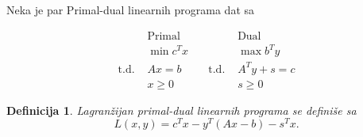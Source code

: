 \documentclass[a4paper, utf8, 11pt, colorlinks]{book}
\newtheorem{definition}{Definicija}[chapter]
\theoremstyle{definition}
\begin{document}
Neka je par Primal-dual linearnih programa dat sa

$$ \begin{array}{llll}
	&\mbox{Primal}            &\quad &\mbox{Dual}     \\
	&\min  c^T x              &\quad &\max  b^T y \\
	\mbox{t.d.\ }	&  Ax = b      &\quad \mbox{t.d.\ } &   A^Ty + s = c \\
	& x \geq 0                &\quad &  s \geq 0
\end{array}
$$


\begin{definition}
	Lagranžijan primal-dual linearnih programa se definiše sa 
	\begin{equation}
		L(x,y) = c^Tx - y^T(Ax - b) - s^T x.
	\end{equation}
\end{definition}
\end{document}
